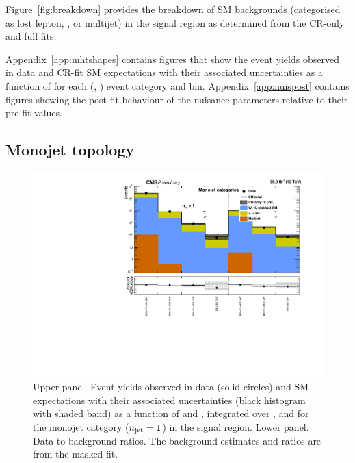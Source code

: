 Figure~\ref{fig:breakdown} provides the breakdown of SM backgrounds
(categorised as lost lepton, \znunuj, or multijet) in the signal
region as determined from the CR-only and full fits.

Appendix~\ref{app:mhtshapes} contains figures that show the event
yields observed in data and CR-fit SM expectations with their
associated uncertainties as a function of \HTmiss for each (\njet,
\nb) event category and \scalht bin. Appendix~\ref{app:nuispost}
contains figures showing the post-fit behaviour of the nuisance
parameters relative to their pre-fit values.

\clearpage
\subsection{Monojet topology}

\begin{figure}[h!]
  \centering
  \caption{Upper panel. Event yields observed in data (solid circles)
    and SM expectations with their associated uncertainties (black
    histogram with shaded band) as a function of \nb and \scalht,
    integrated over \mht, and for the monojet category ($n_{\text{jet}} = 1$)
    in the signal region. Lower panel. Data-to-background ratios. The
    background estimates and ratios are from the masked fit. }
  \label{fig:mr_mono_pre}
  \includegraphics[width=1.\linewidth]{figures/results/36invfb/mono/summaryPlot_Monojet_prefit}
\end{figure}

